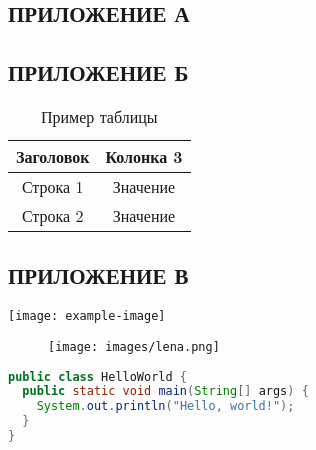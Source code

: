 \begin{center}
    \section*{ПРИЛОЖЕНИЕ А}
\end{center}


\newpage


\begin{center}
    \section*{ПРИЛОЖЕНИЕ Б}
\end{center}

\begin{table}[H]

\captionsetup{justification=raggedright,singlelinecheck=false}
\caption{Пример таблицы}
\captionsetup{justification=justified,singlelinecheck=false}

\begin{tabular}{|c|c|}
\hline
\textbf{Заголовок} & \textbf{Колонка 3} \\ \hline
Строка 1           & Значение           \\ \hline
Строка 2           & Значение           \\ \hline
\end{tabular}

\end{table}


\newpage


\begin{center}
    \section*{ПРИЛОЖЕНИЕ В}
    \texttt{[image: example-image]}
\end{center}


\begin{figure}
\centering
\texttt{[image: images/lena.png]}
\end{figure}

\begin{lstlisting}[language=Java]
public class HelloWorld {
  public static void main(String[] args) {
    System.out.println("Hello, world!");
  }
}
\end{lstlisting}